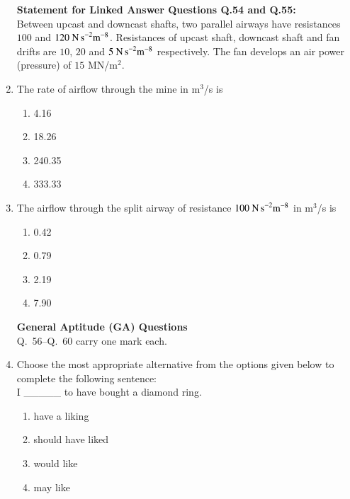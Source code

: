 \documentclass[journal]{IEEEtran}
\begin{document}
\begin{enumerate}[leftmargin=0pt]
\noindent\textbf{Statement for Linked Answer Questions Q.54 and Q.55:}\\
Between upcast and downcast shafts, two parallel airways have resistances $100$ and $120~\text{N\,s}^{-2}\text{m}^{-8}$.
Resistances of upcast shaft, downcast shaft and fan drifts are $10$, $20$ and $5~\text{N\,s}^{-2}\text{m}^{-8}$ respectively.
The fan develops an air power (pressure) of $15$ MN/m$^2$.

\item The rate of airflow through the mine in m$^3$/s is
\begin{multicols}{2}
\begin{enumerate}[label=(\Alph*), itemsep=0pt, topsep=2pt]
  \item 4.16
  \item 18.26
  \item 240.35
  \item 333.33
\end{enumerate}
\end{multicols}
\hfill{}

\item The airflow through the split airway of resistance $100~\text{N\,s}^{-2}\text{m}^{-8}$ in m$^3$/s is
\begin{multicols}{2}
\begin{enumerate}[label=(\Alph*), itemsep=0pt, topsep=2pt]
  \item 0.42
  \item 0.79
  \item 2.19
  \item 7.90
\end{enumerate}
\end{multicols}
\hfill{}

\noindent\textbf{General Aptitude (GA) Questions}\\
\noindent Q.\ 56--Q.\ 60 carry one mark each.

\item Choose the most appropriate alternative from the options given below to complete the following sentence: \\
I \_\_\_\_\_ to have bought a diamond ring.
\begin{multicols}{2}
\begin{enumerate}[label=(\Alph*), itemsep=0pt, topsep=2pt]
  \item have a liking
  \item should have liked
  \item would like
  \item may like
\end{enumerate}
\end{multicols}
\hfill{}


\end{enumerate}
\end{document}
